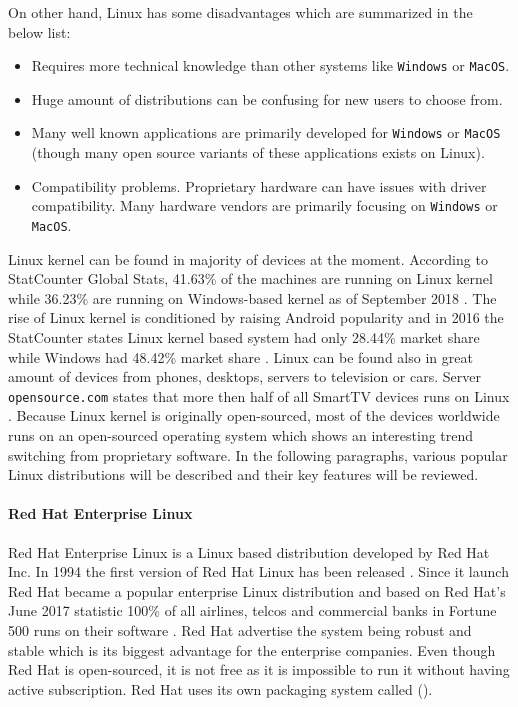 On other hand, Linux has some disadvantages which are summarized in the below list:
\begin{itemize}
	\item Requires more technical knowledge than other systems like \texttt{Windows} or \texttt{MacOS}.
	\item Huge amount of distributions can be confusing for new users to choose from. 
	\item Many well known applications are primarily developed for \texttt{Windows} or \texttt{MacOS} (though many open source variants of these applications exists on Linux).
	\item Compatibility problems. Proprietary hardware can have issues with driver compatibility. Many hardware vendors are primarily focusing on \texttt{Windows} or \texttt{MacOS}.
\end{itemize}
Linux kernel can be found in majority of devices at the moment. According to StatCounter Global Stats, 41.63\% of the machines are running on Linux kernel while 36.23\% are running on Windows-based kernel as of September 2018 \cite{StatCounter}. The rise of Linux kernel is conditioned by raising Android popularity and in 2016 the StatCounter states Linux kernel based system had only 28.44\% market share while Windows had 48.42\% market share \cite{StatCounter}. Linux can be found also in great amount of devices from phones, desktops, servers to television or cars. Server \texttt{opensource.com} states that more then half of all SmartTV devices runs on Linux \cite{opensourcecom}. Because Linux kernel is originally open-sourced, most of the devices worldwide runs on an open-sourced operating system which shows an interesting trend switching from proprietary software. In the following paragraphs, various popular Linux distributions will be described and their key features will be reviewed. 
\paragraph{Red Hat Enterprise Linux}
Red Hat Enterprise Linux is a Linux based distribution developed by Red Hat Inc. In 1994 the first version of Red Hat Linux has been released \cite{rhhistory}. Since it launch Red Hat became a popular enterprise Linux distribution and based on Red Hat's June 2017 statistic 100\% of all airlines, telcos and commercial banks in Fortune 500 runs on their software \cite{rhtrusted}. Red Hat advertise the system being robust and stable which is its biggest advantage for the enterprise companies. Even though Red Hat is open-sourced, it is not free as it is impossible to run it without having active subscription. Red Hat uses its own packaging system called  ().
